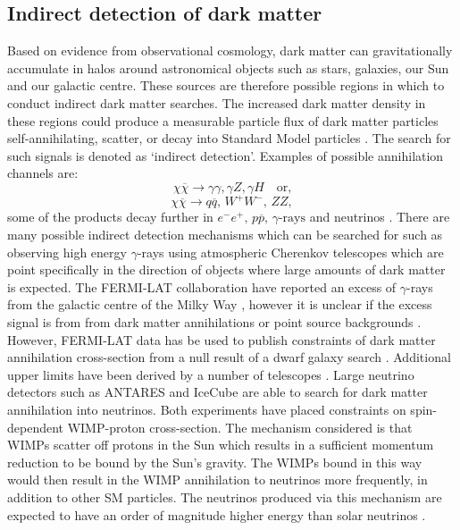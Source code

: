 \subsection{Indirect detection of dark matter}\label{sec:DMOverview/IndirectDM}
Based on evidence from observational cosmology, dark matter can gravitationally accumulate in halos around astronomical objects such as stars, galaxies, our Sun and our galactic centre. These sources are therefore possible regions in which to conduct indirect dark matter searches. The increased dark matter density in these regions could produce a measurable particle flux of dark matter particles self-annihilating, scatter, or decay into Standard Model particles \cite{Strigari:2012acq}. The search for such signals is denoted as `indirect detection'. Examples of possible annihilation channels are:
\begin{equation}
    \chi\overline{\chi}\rightarrow\gamma\gamma,\gamma Z,\gamma H\quad\text{or,}
\end{equation}
\begin{equation}
    \chi\overline{\chi}\rightarrow q\overline{q},\,W^+W^-,\,ZZ,
\end{equation}
some of the products decay further in $e^-e^+,\,p\overline{p},\,\gamma\text{-rays}$ and neutrinos \cite{DirectDetection2015}. There are many possible indirect detection mechanisms which can be searched for such as observing high energy $\gamma$-rays using atmospheric Cherenkov telescopes which are point specifically in the direction of objects where large amounts of dark matter is expected. The FERMI-LAT collaboration have reported an excess of $\gamma$-rays from the galactic centre of the Milky Way \cite{Fermi-LAT:2015sau}, however it is unclear if the excess signal is from from dark matter annihilations or point source backgrounds \cite{Boyarsky_2011}. However, FERMI-LAT data has be used to publish constraints of dark matter annihilation cross-section from a null result of a dwarf galaxy search \cite{Fermi-LAT:2015ycq}. Additional upper limits have been derived by a number of telescopes \cite{Aleksic:2013xea,HESS:2014zqa,VERITAS:2017tif}. Large neutrino detectors such as ANTARES \cite{ANTARES:2016xuh} and IceCube \cite{IceCube:2009iyf} are able to search for dark matter annihilation into neutrinos. Both experiments have placed constraints on spin-dependent WIMP-proton cross-section. The mechanism considered is that WIMPs scatter off protons in the Sun which results in a sufficient momentum reduction to be bound by the Sun's gravity. The WIMPs bound in this way would then result in the WIMP annihilation to neutrinos more frequently, in addition to other SM particles. The neutrinos produced via this mechanism are expected to have an order of magnitude higher energy than solar neutrinos \cite{Hooper:2025ohk,Super-Kamiokande:2020sgt}.

